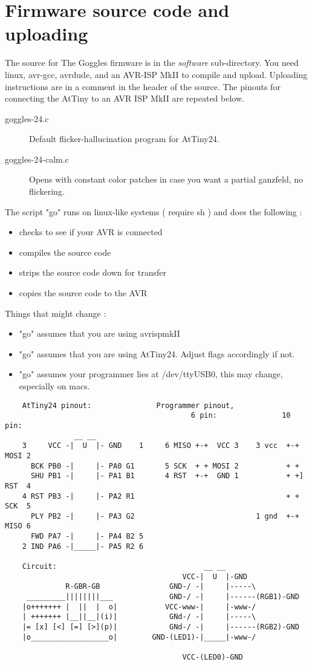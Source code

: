 \documentclass[11pt]{scrartcl}
\newenvironment{itemised}{
\begin{itemize}
  \setlength{\itemsep}{1pt}
  \setlength{\parskip}{0pt}
  \setlength{\parsep}{0pt}
}{\end{itemize}}
\begin{document}
\section{Firmware source code and uploading}
The source for The Goggles firmware is in the \emph{software} sub-directory.
You need linux, avr-gcc, avrdude, and an AVR-ISP MkII to compile and upload. Uploading instructions are in a comment in the header of the source. The pinouts for connecting the AtTiny to an AVR ISP MkII are repeated below.
\begin{description}
\item[goggles-24.c] Default flicker-hallucination program for AtTiny24.
\item[goggles-24-calm.c] Opens with constant color patches in case you want a partial ganzfeld, no flickering. 
\end{description}
The script "go" runs on linux-like systems ( require sh ) and does the following : 
\begin{itemised}
\item checks to see if your AVR is connected
\item compiles the source code
\item strips the source code down for transfer
\item copies the source code to the AVR
\end{itemised}
Things that might change :
\begin{itemised}
\item "go" assumes that you are using avrispmkII
\item "go" assumes that you are using AtTiny24. Adjust flags accordingly if not.
\item "go" assumes your programmer lies at /dev/ttyUSB0, this may change, especially on macs.
\end{itemised}
\begin{verbatim}
    AtTiny24 pinout:               Programmer pinout, 
                                           6 pin:               10 pin:
                __ __
    3     VCC -|  U  |- GND    1     6 MISO +-+  VCC 3    3 vcc  +-+   MOSI 2
      BCK PB0 -|     |- PA0 G1       5 SCK  + + MOSI 2           + +    
      SHU PB1 -|     |- PA1 B1       4 RST  +-+  GND 1           + +]  RST  4
    4 RST PB3 -|     |- PA2 R1                                   + +   SCK  5 
      PLY PB2 -|     |- PA3 G2                            1 gnd  +-+   MISO 6
      FWD PA7 -|     |- PA4 B2 5 
    2 IND PA6 -|_____|- PA5 R2 6 
    
    Circuit:                                  __ __
                                         VCC-|  U  |-GND
              R-GBR-GB                GND-/ -|     |-----\
     _________||||||||___             GND-/ -|     |------(RGB1)-GND
    |o+++++++ |  ||  |  o|           VCC-www-|     |-www-/
    | +++++++ |__||__|(i)|            GNd-/ -|     |-----\
    |= [x] [<] [=] [>](p)|            GNd-/ -|     |------(RGB2)-GND
    |o__________________o|        GND-(LED1)-|_____|-www-/

                                         VCC-(LED0)-GND
\end{verbatim}
\end{document}
